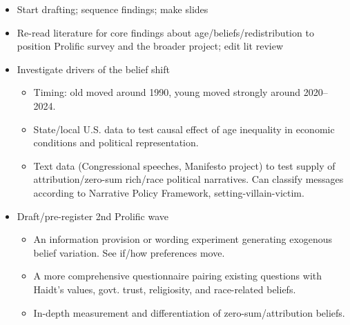 \documentclass{article}
\newcommand{\blue}[1]{\textcolor{blue}{#1}}
\begin{document}
\begin{itemize} 
    \item Start drafting; sequence findings; make slides
    \item Re-read literature for core findings about age/beliefs/redistribution to position Prolific survey and the broader project; edit lit review
    \item Investigate drivers of the belief shift
    \begin{itemize}
        \item Timing: old moved around 1990, young moved strongly around 2020--2024.
        \item State/local U.S. data to test causal effect of age inequality in economic conditions and political representation.
        \item Text data (Congressional speeches, Manifesto project) to test supply of attribution/zero-sum rich/race political narratives. Can classify messages according to Narrative Policy Framework, setting-villain-victim.
    \end{itemize}
    \item Draft/pre-register 2nd Prolific wave
    \begin{itemize}
        \item An information provision or wording experiment generating exogenous belief variation. See if/how preferences move.
        \item A more comprehensive questionnaire pairing existing questions with Haidt's values, govt. trust, religiosity, and race-related beliefs.
        \item In-depth measurement and differentiation of zero-sum/attribution beliefs.
    \end{itemize}
\end{itemize}

\end{document}
